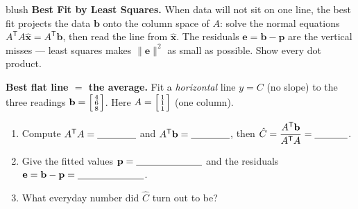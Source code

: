 \documentclass[10pt]{article}
\newcommand{\xx}{\mathbf{x}}
\newcommand{\bb}{\mathbf{b}}
\newcommand{\pp}{\mathbf{p}}
\newcommand{\ee}{\mathbf{e}}
\newcommand{\T}{\mathsf{T}}
\begin{document}
\namepartnerperiod

\vspace{0.10in}

\begin{headlinebox}{blush}
\small\textbf{Best Fit by Least Squares.} When data will not sit on one line, the best fit projects the
data $\bb$ onto the column space of $A$: solve the normal equations $A^{\T}A\hat{\xx}=A^{\T}\bb$, then
read the line from $\hat{\xx}$. The residuals $\ee=\bb-\pp$ are the vertical misses --- least squares
makes $\|\ee\|^2$ as small as possible. Show every dot product.
\end{headlinebox}

\vspace{0.08in}

\begin{tcolorbox}[colback=white, colframe=black!40, title=\textbf{Tier R --- Remediate},
    fonttitle=\bfseries, arc=1.5mm, left=3mm, right=3mm, top=2mm, bottom=2mm, breakable]
\textbf{Best flat line $=$ the average.} Fit a \emph{horizontal} line $y=C$ (no slope) to the three
readings $\bb=\begin{bsmallmatrix} 4\\6\\8 \end{bsmallmatrix}$. Here $A=\begin{bsmallmatrix} 1\\1\\1 \end{bsmallmatrix}$ (one column).
\begin{enumerate}[leftmargin=1.7em, itemsep=7pt]
  \item Compute $A^{\T}A=\blank{1.4cm}$ and $A^{\T}\bb=\blank{1.4cm}$, then
        $\hat{C}=\dfrac{A^{\T}\bb}{A^{\T}A}=\blank{1.2cm}$.
  \item Give the fitted values $\pp=\blank{2.4cm}$ and the residuals $\ee=\bb-\pp=\blank{2.4cm}$.
  \item What everyday number did $\hat{C}$ turn out to be? \blank{3.2cm}
\end{enumerate}
\end{tcolorbox}
\end{document}
